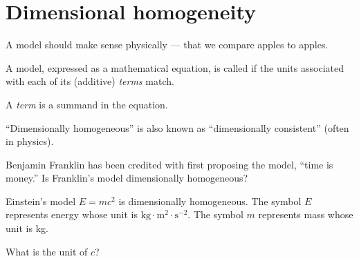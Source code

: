 \documentclass[../main.tex]{subfiles}
\begin{document}
 \section{Dimensional homogeneity}

A model should make sense physically --- that we compare apples to apples.

\begin{definition} \label{def:dimensional-homogeneity}
  A model, expressed as a mathematical equation, is called  if the units associated with each of its (additive) \emph{terms} match.
\end{definition}

A \emph{term} is a summand in the equation.

\faPencil*{} ``Dimensionally homogeneous'' is also known as ``dimensionally consistent'' (often in physics).


\begin{example} \label{ex:time-is-money}
  Benjamin Franklin has been credited with first proposing the model, ``time is money.'' Is Franklin's model dimensionally homogeneous?

\end{example}

\begin{exercise} \label{ex:emc2}
  Einstein's model \(E = mc^{2}\) is dimensionally homogeneous. The symbol \(E\) represents energy whose unit is \(\text{kg} \cdot \text{m}^{2} \cdot \text{s}^{-2}\). The symbol \(m\) represents mass whose unit is kg. 

  What is the unit of \(c\)?

\end{exercise}
\end{document}

